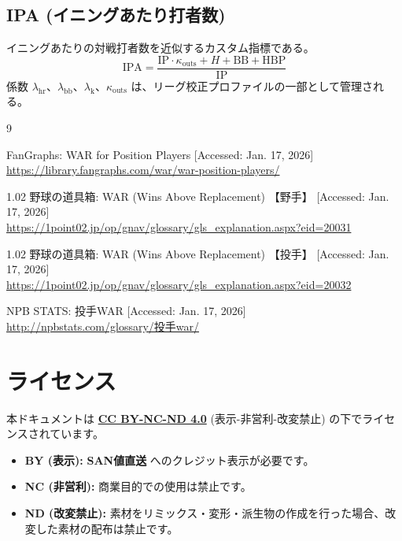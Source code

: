 \documentclass[uplatex,a4paper,11pt,dvipdfmx]{jsarticle}
\newcommand{\mvar}[1]{\mathrm{#1}}
\newcommand{\refurl}[1]{{\small \url{#1}}}
\begin{document}
\subsection{IPA (イニングあたり打者数)}
イニングあたりの対戦打者数を近似するカスタム指標である。
\begin{equation}
\mvar{IPA} = \frac{\mvar{IP} \cdot \kappa_{\text{outs}} + H + \mvar{BB} + \mvar{HBP}}{\mvar{IP}}
\end{equation}
係数 $\lambda_{\text{hr}}$、$\lambda_{\text{bb}}$、$\lambda_{\text{k}}$、$\kappa_{\text{outs}}$ は、リーグ校正プロファイルの一部として管理される。

\begin{thebibliography}{9}

FanGraphs: WAR for Position Players [Accessed: Jan. 17, 2026] \\
\refurl{https://library.fangraphs.com/war/war-position-players/}

1.02 野球の道具箱: WAR (Wins Above Replacement) 【野手】 [Accessed: Jan. 17, 2026] \\
\refurl{https://1point02.jp/op/gnav/glossary/gls_explanation.aspx?eid=20031}

1.02 野球の道具箱: WAR (Wins Above Replacement) 【投手】 [Accessed: Jan. 17, 2026] \\
\refurl{https://1point02.jp/op/gnav/glossary/gls_explanation.aspx?eid=20032}

NPB STATS: 投手WAR [Accessed: Jan. 17, 2026] \\
\refurl{http://npbstats.com/glossary/投手war/}

\end{thebibliography}

\section*{ライセンス}

\noindent 本ドキュメントは \href{http://creativecommons.org/licenses/by-nc-nd/4.0/}{\textbf{CC BY-NC-ND 4.0}} (表示-非営利-改変禁止) の下でライセンスされています。

\begin{itemize}
    \item \textbf{BY (表示):} \textbf{SAN値直送} へのクレジット表示が必要です。
    \item \textbf{NC (非営利):} 商業目的での使用は禁止です。
    \item \textbf{ND (改変禁止):} 素材をリミックス・変形・派生物の作成を行った場合、改変した素材の配布は禁止です。
\end{itemize}
\end{document}
